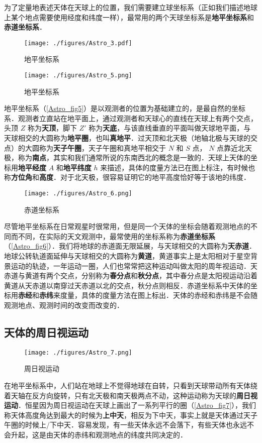 为了定量地表述天体在天球上的位置，我们需要建立球坐标系（正如我们描述地球上某个地点需要使用经度和纬度一样），最常用的两个天球坐标系是\textbf{地平坐标系}和\textbf{赤道坐标系}．

\begin{figure}[ht]
\centering
\texttt{[image: ./figures/Astro\_3.pdf]}
\caption{地平坐标系} \label{Astro_fig8}
\end{figure}

\begin{figure}[ht]
\centering
\texttt{[image: ./figures/Astro\_5.png]}
\caption{地平坐标系} \label{Astro_fig5}
\end{figure}

地平坐标系（\autoref{Astro_fig5}）是以观测者的位置为基础建立的，是最自然的坐标系．观测者立直站在地平面上，通过观测者和天球心的直线在天球上有两个交点，头顶 $Z$ 称为\textbf{天顶}，脚下 $Z'$ 称为\textbf{天底}，与该直线垂直的平面叫做天球地平面，与天球相交的大圆称为\textbf{地平圈}，也叫\textbf{真地平}．过天顶和北天极（地轴北极与天球的交点）的大圆称为\textbf{天子午圈}，天子午圈和真地平相交于 $N$ 和 $S$ 点， $N$ 点靠近北天极，称为\textbf{南点}，其实和我们通常所说的东南西北的概念是一致的．天球上天体的坐标用\textbf{地平经度} $A$ 和\textbf{地平纬度} $h$ 来描述，具体的度量方法已在图上标注，有时候也称\textbf{方位角}和\textbf{高度}．对于北天极，很容易证明它的地平高度恰好等于该地的纬度．

\begin{figure}[ht]
\centering
\texttt{[image: ./figures/Astro\_6.png]}
\caption{赤道坐标系} \label{Astro_fig6}
\end{figure}

尽管地平坐标系在日常观星时很常用，但是同一个天体的坐标会随着观测地点的不同而不同，在实际的天文观测中，最常使用的坐标系称为\textbf{赤道坐标系}（\autoref{Astro_fig6}）．我们将地球的赤道面无限延展，与天球相交的大圆称为\textbf{天赤道}．地球公转轨道面延伸与天球相交的大圆称为\textbf{黄道}，黄道事实上是太阳相对于星空背景运动的轨迹，一年运动一圈，人们也常常把这种运动叫做太阳的周年视运动．天赤道与黄道有两个交点，分别称为\textbf{春分点}和\textbf{秋分点}，其中春分点是太阳视运动沿着黄道从天赤道以南穿过天赤道以北的交点，秋分点则相反．赤道坐标系中天体的坐标用\textbf{赤经}和\textbf{赤纬}来度量，具体的度量方法在图上标出．天体的赤经和赤纬是不会随观测地点、观测时间的改变而改变的．

\subsection{天体的周日视运动}

\begin{figure}[ht]
\centering
\texttt{[image: ./figures/Astro\_7.png]}
\caption{周日视运动} \label{Astro_fig7}
\end{figure}

在地平坐标系中，人们站在地球上不觉得地球在自转，只看到天球带动所有天体绕着天轴在反方向旋转，只有北天极和南天极两点不动，这种运动称为天球的\textbf{周日视运动}．恒星因为周日视运动在天球上画出了一系列平行的圈（\autoref{Astro_fig7}），我们称天体高度角达到最大的时候为\textbf{上中天}，相反为下中天，事实上就是天体通过天子午圈的时候上/下中天．容易发现，有一些天体永远不会落下，有些天体也永远不会升起，这是由天体的赤纬和观测地点的纬度共同决定的．
